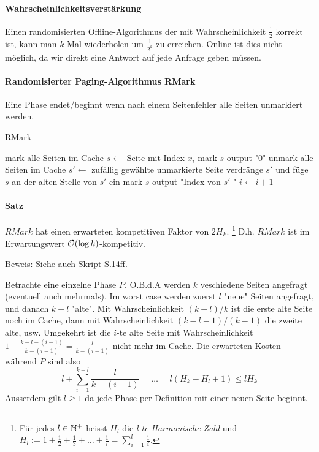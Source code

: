 \paragraph{Wahrscheinlichkeitsverstärkung}
Einen randomisierten Offline-Algorithmus der mit Wahrscheinlichkeit $\frac{1}{2}$ korrekt ist,
kann man $k$ Mal wiederholen um $\frac{1}{2^k}$ zu erreichen.
Online ist dies \underline{nicht} möglich, da wir direkt eine Antwort auf jede Anfrage geben müssen.

\paragraph{Randomisierter Paging-Algorithmus RMark}
Eine Phase endet/beginnt wenn nach einem Seitenfehler alle Seiten unmarkiert werden.

\begin{algorithm}[h]
\caption{RMark}
\begin{algorithmic}
    \State mark alle Seiten im Cache
        \State $s \gets$ Seite mit Index $x_i$
                \State mark $s$
            \EndIf
        \State output "0"
        \Else
                \State unmark alle Seiten im Cache
            \EndIf
            \State $s' \gets$ zufällig gewählte unmarkierte Seite
            \State verdränge $s'$ und füge $s$ an der alten Stelle von $s'$ ein
            \State mark $s$
            \State output "Index von $s'$ "
        \EndIf
    \State $i \gets i + 1$
    \EndWhile
\end{algorithmic}
\end{algorithm}


\paragraph{Satz}
$RMark$ hat einen erwarteten kompetitiven Faktor von $2 H_k$.
\footnote{Für jedes $l \in \mathbb{N}^+$ heisst $H_l$ die \emph{l-te Harmonische Zahl}
und $H_l := 1 + \frac{1}{2} + \frac{1}{3} + \dots + \frac{1}{l} = \sum_{i=1}^l \frac{1}{i} $.}
D.h. $RMark$ ist im Erwartungswert $\mathcal{O}(\log k)$-kompetitiv.

\underline{Beweis:} Siehe auch Skript S.14ff.

Betrachte eine einzelne Phase $P$.
O.B.d.A werden $k$ veschiedene Seiten angefragt (eventuell auch mehrmals).
Im worst case werden zuerst $l$ "neue" Seiten angefragt, und danach $k-l$ "alte".
Mit Wahrscheinlichkeit $(k-l)/k$ ist die erste alte Seite noch im Cache,
dann mit Wahrscheinlichkeit $(k-l-1)/(k-1)$ die zweite alte, usw.
Umgekehrt ist die $i$-te alte Seite mit Wahrscheinlichkeit
$1 - \frac{k-l-(i-1)}{k-(i-1)} = \frac{l}{k-(i-1)}$ \underline{nicht} mehr im Cache.
Die erwarteten Kosten während $P$ sind also
$$ l + \sum_{i=1}^{k-l} \dfrac{l}{k-(i-1)} = \dots = l (H_k - H_l +1) \leq l H_k $$
Ausserdem gilt $l \geq 1$ da jede Phase per Definition mit einer neuen Seite beginnt.

